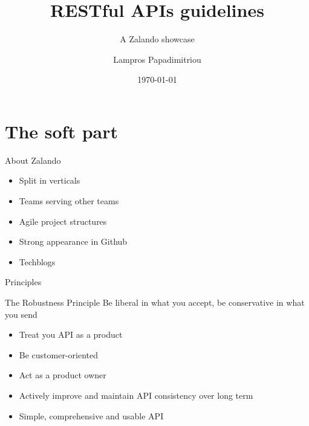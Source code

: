 \documentclass[10pt]{beamer}
\title{RESTful APIs guidelines}
\subtitle{A Zalando showcase}
\date{\today}
\author{Lampros Papadimitriou}
\institute{Check24 Baufinanzierung GmbH}
\begin{document}
\maketitle

\section{The soft part}

\begin{frame}{About Zalando}
\begin{itemize}
	\item Split in verticals
	\item Teams serving other teams
	\item Agile project structures
	\item Strong appearance in Github
	\item Techblogs
\end{itemize}
\end{frame}

\begin{frame}{Principles}

  \begin{alertblock}{The Robustness Principle}
    Be liberal in what you accept, be conservative in what you send
  \end{alertblock}

  \begin{itemize}
    \item Treat you API as a product
    \item Be customer-oriented
    \item Act as a product owner
    \item Actively improve and maintain API consistency over long term
    \item Simple, comprehensive and usable API
  \end{itemize}

\end{frame}
\end{document}
